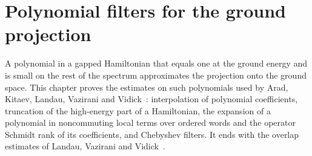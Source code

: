 \chapter{Polynomial filters for the ground projection}
\label{ch:polynomial_filters}

A polynomial in a gapped Hamiltonian that equals one at the ground energy and
is small on the rest of the spectrum approximates the projection onto the
ground space. This chapter proves the estimates on such polynomials used by
Arad, Kitaev, Landau, Vazirani and
Vidick~\cite{Arad2013AreaLaw,Arad2016RigorousRG}: interpolation of polynomial
coefficients, truncation of the high-energy part of a Hamiltonian, the
expansion of a polynomial in noncommuting local terms over ordered words and
the operator Schmidt rank of its coefficients, and Chebyshev filters. It ends
with the overlap estimates of Landau, Vazirani and
Vidick~\cite{Landau2013PolynomialTime}.


















